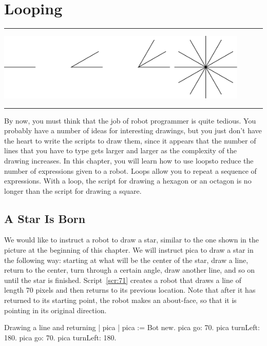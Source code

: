 \documentclass[a4paper,10pt,twoside]{book}
\begin{document}
    \sloppy
\fi

\chapter{Looping}\label{cha:looping}

\noindent\hrule
\includegraphics[width=0.9\textwidth]{loopTitlePicture}
\noindent\hrule\vspace{1.5cm}

By now, you must think that the job of robot programmer is quite tedious. You probably 
have a number of ideas for interesting drawings, but you just don’t have the heart to write 
the scripts to draw them, since it appears that the number of lines that you have to type gets 
larger and larger as the complexity of the drawing increases. In this chapter, you will learn how 
to use loopsto reduce the number of expressions given to a robot. Loops allow you to repeat a 
sequence of expressions. With a loop, the script for drawing a hexagon or an octagon is no 
longer than the script for drawing a square. 

\section{A Star Is Born} 

We would like to instruct a robot to draw a star, similar to the one shown in the picture at the 
beginning of this chapter. We will instruct pica to draw a star in the following way: starting at 
what will be the center of the star, draw a line, return to the center, turn through a certain 
angle, draw another line, and so on until the star is finished. Script~\ref{scr:71} creates a robot that 
draws a line of length 70 pixels and then returns to its previous location. Note that after it has 
returned to its starting point, the robot makes an about-face, so that it is pointing in its original direction. 

\begin{script}[71]{Drawing a line and returning}
| pica | 
pica := Bot new. 
pica go: 70. 
pica turnLeft: 180. 
pica go: 70. 
pica turnLeft: 180.
\end{script}
\end{document}
